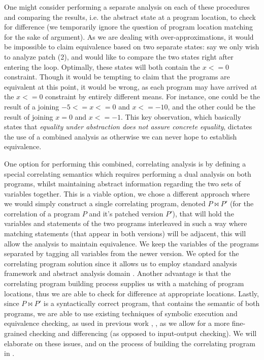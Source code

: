 One might consider performing a separate analysis on each of these procedures and comparing the results, i.e. the abstract state at a program location, to check for difference (we temporarily ignore the question of program location matching for the sake of argument). As we are dealing with over-approximations, it would be impossible to claim equivalence based on two separate states: say we only wish to analyze patch (2), and would like to compare the two states right after entering the loop. Optimally, these states will both contain the ${x<=0}$ constraint. Though it would be tempting to claim that the programs are equivalent at this point, it would be wrong, as each program may have arrived at the ${x<=0}$ constraint by entirely different means. For instance, one could be the result of a joining ${-5<=x<=0}$ and ${x<=-10}$, and the other could be the result of joining ${x=0}$ and ${x<=-1}$. This key observation, which basically states that \emph{equality under abstraction does not assure concrete equality}, dictates the use of a combined analysis as otherwise we can never hope to establish equivalence.

One option for performing this combined, correlating analysis is by defining a special correlating semantics which requires performing a dual analysis on both programs, whilst maintaining abstract information regarding the two sets of variables together. This is a viable option, we chose a different approach where we would simply construct a single correlating program, denoted $P \bowtie P'$ (for the correlation of a program $P$ and it's patched version $P'$), that will hold the variables and statements of the two programs interleaved in such a way where matching statements (that appear in both versions) will be adjacent, this will allow the analysis to maintain equivalence. We keep the variables of the programs separated by tagging all variables from the newer version. We opted for the correlating program solution since it allows us to employ standard analysis framework \cite{CLang} and abstract analysis domain \cite{JeannetMine09}. Another advantage is that the correlating program building process supplies us with a matching of program locations, thus we are able to check for difference at appropriate locations. Lastly, since $P \bowtie P'$ is a syntactically correct program, that contains the semantic of both programs, we are able to use existing techniques of symbolic execution and equivalence checking, as used in previous work \cite{GodlinStrichman09,DwyerElbaumPerson08,EnglerRamos11}, , as we allow for a more fine-grained checking and differencing (as opposed to input-output checking). We will elaborate on these issues, and on the process of building the correlating program in .

